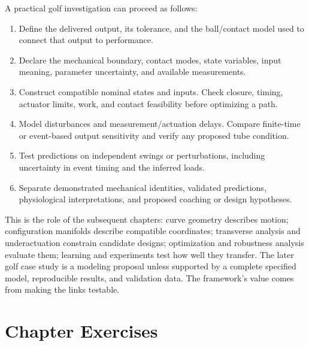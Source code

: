\documentclass[12pt, openany]{book}
\theoremstyle{plain}
\begin{document}
A practical golf investigation can proceed as follows:
\begin{enumerate}
\item Define the delivered output, its tolerance, and the ball/contact model
      used to connect that output to performance.
\item Declare the mechanical boundary, contact modes, state variables, input
      meaning, parameter uncertainty, and available measurements.
\item Construct compatible nominal states and inputs. Check closure, timing,
      actuator limits, work, and contact feasibility before optimizing a path.
\item Model disturbances and measurement/actuation delays. Compare finite-time
      or event-based output sensitivity and verify any proposed tube condition.
\item Test predictions on independent swings or perturbations, including
      uncertainty in event timing and the inferred loads.
\item Separate demonstrated mechanical identities, validated predictions,
      physiological interpretations, and proposed coaching or design hypotheses.
\end{enumerate}

This is the role of the subsequent chapters: curve geometry describes motion;
configuration manifolds describe compatible coordinates; transverse analysis
and underactuation constrain candidate designs; optimization and robustness
analysis evaluate them; learning and experiments test how well they transfer.
The later golf case study is a modeling proposal unless supported by a complete
specified model, reproducible results, and validation data. The framework's
value comes from making the links testable.

\section{Chapter Exercises}
\end{document}
